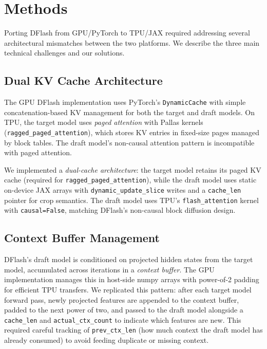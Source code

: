 \documentclass[12pt,letterpaper]{article}
\begin{document}
\section{Methods}

Porting DFlash from GPU/PyTorch to TPU/JAX required addressing several architectural mismatches between the two platforms. We describe the three main technical challenges and our solutions.

\subsection{Dual KV Cache Architecture}

The GPU DFlash implementation uses PyTorch's \texttt{DynamicCache} with simple concatenation-based KV management for both the target and draft models. On TPU, the target model uses \emph{paged attention} with Pallas kernels (\texttt{ragged\_paged\_attention}), which stores KV entries in fixed-size pages managed by block tables. The draft model's non-causal attention pattern is incompatible with paged attention.

We implemented a \textit{dual-cache architecture}: the target model retains its paged KV cache (required for \texttt{ragged\_paged\_attention}), while the draft model uses static on-device JAX arrays with \texttt{dynamic\_update\_slice} writes and a \texttt{cache\_len} pointer for crop semantics. The draft model uses TPU's \texttt{flash\_attention} kernel with \texttt{causal=False}, matching DFlash's non-causal block diffusion design.

\subsection{Context Buffer Management}

DFlash's draft model is conditioned on projected hidden states from the target model, accumulated across iterations in a \emph{context buffer}. The GPU implementation manages this in host-side numpy arrays with power-of-2 padding for efficient TPU transfers. We replicated this pattern: after each target model forward pass, newly projected features are appended to the context buffer, padded to the next power of two, and passed to the draft model alongside a \texttt{cache\_len} and \texttt{actual\_ctx\_count} to indicate which features are new. This required careful tracking of \texttt{prev\_ctx\_len} (how much context the draft model has already consumed) to avoid feeding duplicate or missing context.
\end{document}

